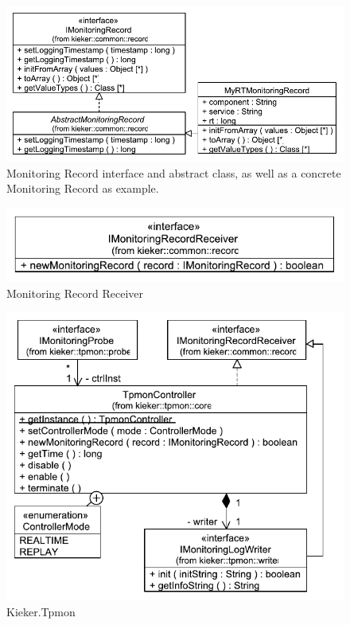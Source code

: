 \begin{figure}
\centering
\includegraphics[scale=0.65]{figures/model/kieker_MyRTMonitoringRecord}%
\caption{Monitoring Record interface and abstract class, as well as a concrete Monitoring Record as example.}
\label{fig:kieker:coreFrameworkClassesAndInterfaces:record}
\end{figure}

\begin{figure}\centering
\includegraphics[scale=0.65]{figures/model/kieker_IMonitoringRecordReceiver}
\caption{Monitoring Record Receiver}
\label{fig:record:IMonitoringRecordReceiver}
\end{figure}

\begin{figure}\centering
\includegraphics[scale=0.65]{figures/model/kieker_TpmonController}%
\caption{Kieker.Tpmon}
\label{fig:kieker:coreFrameworkClassesAndInterfaces:tpmon}
\end{figure}

